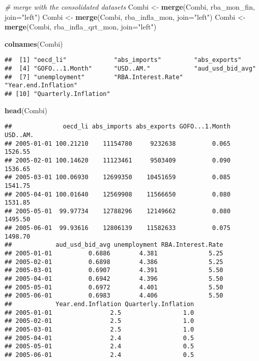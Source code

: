 \documentclass[]{article}
\newenvironment{Shaded}{\begin{snugshade}}{\end{snugshade}}
\newcommand{\KeywordTok}[1]{\textcolor[rgb]{0.13,0.29,0.53}{\textbf{#1}}}
\newcommand{\DataTypeTok}[1]{\textcolor[rgb]{0.13,0.29,0.53}{#1}}
\newcommand{\StringTok}[1]{\textcolor[rgb]{0.31,0.60,0.02}{#1}}
\newcommand{\CommentTok}[1]{\textcolor[rgb]{0.56,0.35,0.01}{\textit{#1}}}
\newcommand{\NormalTok}[1]{#1}
\begin{document}
\begin{Shaded}
\begin{Highlighting}[]
    \CommentTok{# merge with the consolidated datasets}
\NormalTok{    Combi <-}\StringTok{ }\KeywordTok{merge}\NormalTok{(Combi, rba_mon_fin, }\DataTypeTok{join=}\StringTok{"left"}\NormalTok{)}
\NormalTok{    Combi <-}\StringTok{ }\KeywordTok{merge}\NormalTok{(Combi, rba_infla_mon, }\DataTypeTok{join=}\StringTok{"left"}\NormalTok{)}
\NormalTok{    Combi <-}\StringTok{ }\KeywordTok{merge}\NormalTok{(Combi, rba_infla_qrt_mon, }\DataTypeTok{join=}\StringTok{"left"}\NormalTok{)}
    
    \KeywordTok{colnames}\NormalTok{(Combi)}
\end{Highlighting}
\end{Shaded}

\begin{verbatim}
##  [1] "oecd_li"             "abs_imports"         "abs_exports"        
##  [4] "GOFO...1.Month"      "USD..AM."            "aud_usd_bid_avg"    
##  [7] "unemployment"        "RBA.Interest.Rate"   "Year.end.Inflation" 
## [10] "Quarterly.Inflation"
\end{verbatim}

\begin{Shaded}
\begin{Highlighting}[]
    \KeywordTok{head}\NormalTok{(Combi)}
\end{Highlighting}
\end{Shaded}

\begin{verbatim}
##              oecd_li abs_imports abs_exports GOFO...1.Month USD..AM.
## 2005-01-01 100.21210    11154780     9232638          0.065  1526.55
## 2005-02-01 100.14620    11123461     9503409          0.090  1536.65
## 2005-03-01 100.06930    12699350    10451659          0.085  1541.75
## 2005-04-01 100.01640    12569908    11566650          0.080  1531.85
## 2005-05-01  99.97734    12788296    12149662          0.080  1495.50
## 2005-06-01  99.93616    12806139    11582633          0.075  1498.70
##            aud_usd_bid_avg unemployment RBA.Interest.Rate
## 2005-01-01          0.6886        4.381              5.25
## 2005-02-01          0.6898        4.386              5.25
## 2005-03-01          0.6907        4.391              5.50
## 2005-04-01          0.6942        4.396              5.50
## 2005-05-01          0.6972        4.401              5.50
## 2005-06-01          0.6983        4.406              5.50
##            Year.end.Inflation Quarterly.Inflation
## 2005-01-01                2.5                 1.0
## 2005-02-01                2.5                 1.0
## 2005-03-01                2.5                 1.0
## 2005-04-01                2.4                 0.5
## 2005-05-01                2.4                 0.5
## 2005-06-01                2.4                 0.5
\end{verbatim}
\end{document}
